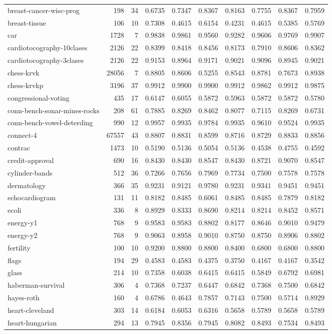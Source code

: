 \documentclass{article}
\begin{document}
\begin{table}
\begin{tabular}{lrrlllllll}
breast-cancer-wisc-prog & 198 & 34 & 0.6735 & 0.7347 & 0.8367 & 0.8163 & 0.7755 & 0.8367 & 0.7959\tabularnewline
breast-tissue & 106 & 10 & 0.7308 & 0.4615 & 0.6154 & 0.4231 & 0.4615 & 0.5385 & 0.5769\tabularnewline
car & 1728 & 7 & 0.9838 & 0.9861 & 0.9560 & 0.9282 & 0.9606 & 0.9769 & 0.9907\tabularnewline
cardiotocography-10clases & 2126 & 22 & 0.8399 & 0.8418 & 0.8456 & 0.8173 & 0.7910 & 0.8606 & 0.8362\tabularnewline
cardiotocography-3clases & 2126 & 22 & 0.9153 & 0.8964 & 0.9171 & 0.9021 & 0.9096 & 0.8945 & 0.9021\tabularnewline
chess-krvk & 28056 & 7 & 0.8805 & 0.8606 & 0.5255 & 0.8543 & 0.8781 & 0.7673 & 0.8938\tabularnewline
chess-krvkp & 3196 & 37 & 0.9912 & 0.9900 & 0.9900 & 0.9912 & 0.9862 & 0.9912 & 0.9875\tabularnewline
congressional-voting & 435 & 17 & 0.6147 & 0.6055 & 0.5872 & 0.5963 & 0.5872 & 0.5872 & 0.5780\tabularnewline
conn-bench-sonar-mines-rocks & 208 & 61 & 0.7885 & 0.8269 & 0.8462 & 0.8077 & 0.7115 & 0.8269 & 0.6731\tabularnewline
conn-bench-vowel-deterding & 990 & 12 & 0.9957 & 0.9935 & 0.9784 & 0.9935 & 0.9610 & 0.9524 & 0.9935\tabularnewline
connect-4 & 67557 & 43 & 0.8807 & 0.8831 & 0.8599 & 0.8716 & 0.8729 & 0.8833 & 0.8856\tabularnewline
contrac & 1473 & 10 & 0.5190 & 0.5136 & 0.5054 & 0.5136 & 0.4538 & 0.4755 & 0.4592\tabularnewline
credit-approval & 690 & 16 & 0.8430 & 0.8430 & 0.8547 & 0.8430 & 0.8721 & 0.9070 & 0.8547\tabularnewline
cylinder-bands & 512 & 36 & 0.7266 & 0.7656 & 0.7969 & 0.7734 & 0.7500 & 0.7578 & 0.7578\tabularnewline
dermatology & 366 & 35 & 0.9231 & 0.9121 & 0.9780 & 0.9231 & 0.9341 & 0.9451 & 0.9451\tabularnewline
echocardiogram & 131 & 11 & 0.8182 & 0.8485 & 0.6061 & 0.8485 & 0.8485 & 0.7879 & 0.8182\tabularnewline
ecoli & 336 & 8 & 0.8929 & 0.8333 & 0.8690 & 0.8214 & 0.8214 & 0.8452 & 0.8571\tabularnewline
energy-y1 & 768 & 9 & 0.9583 & 0.9583 & 0.8802 & 0.8177 & 0.8646 & 0.9010 & 0.9479\tabularnewline
energy-y2 & 768 & 9 & 0.9063 & 0.8958 & 0.9010 & 0.8750 & 0.8750 & 0.8906 & 0.8802\tabularnewline
fertility & 100 & 10 & 0.9200 & 0.8800 & 0.8800 & 0.8400 & 0.6800 & 0.6800 & 0.8800\tabularnewline
flags & 194 & 29 & 0.4583 & 0.4583 & 0.4375 & 0.3750 & 0.4167 & 0.4167 & 0.3542\tabularnewline
glass & 214 & 10 & 0.7358 & 0.6038 & 0.6415 & 0.6415 & 0.5849 & 0.6792 & 0.6981\tabularnewline
haberman-survival & 306 & 4 & 0.7368 & 0.7237 & 0.6447 & 0.6842 & 0.7368 & 0.7500 & 0.6842\tabularnewline
hayes-roth & 160 & 4 & 0.6786 & 0.4643 & 0.7857 & 0.7143 & 0.7500 & 0.5714 & 0.8929\tabularnewline
heart-cleveland & 303 & 14 & 0.6184 & 0.6053 & 0.6316 & 0.5658 & 0.5789 & 0.5658 & 0.5789\tabularnewline
heart-hungarian & 294 & 13 & 0.7945 & 0.8356 & 0.7945 & 0.8082 & 0.8493 & 0.7534 & 0.8493\tabularnewline

\end{tabular}
\end{table}
\end{document}
